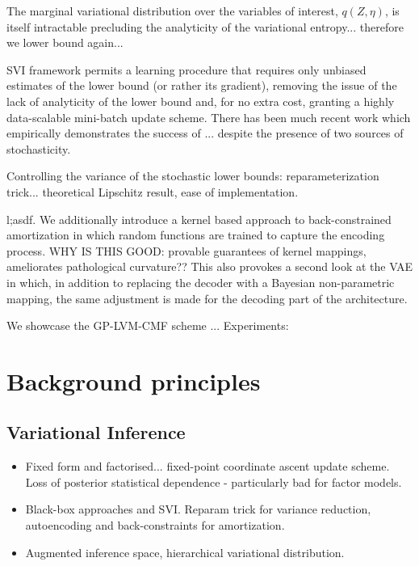 \documentclass{article}
\begin{document}
The marginal variational distribution over the variables of interest, $q(Z,\eta)$, is itself intractable precluding the analyticity of the variational entropy... therefore we lower bound again...

SVI framework permits a learning procedure that requires only unbiased estimates of the lower bound (or rather its gradient), removing the issue of the lack of analyticity of the lower bound and, for no extra cost, granting a highly data-scalable mini-batch update scheme. There has been much recent work which empirically demonstrates the success of ... despite the presence of two sources of stochasticity.

Controlling the variance of the stochastic lower bounds: reparameterization trick... theoretical Lipschitz result, ease of implementation.


l;asdf. We additionally introduce a kernel based approach to back-constrained amortization in which random functions are trained to capture the encoding process. WHY IS THIS GOOD: provable guarantees of kernel mappings, ameliorates pathological curvature??
This also provokes a second look at the VAE in which, in addition to replacing the decoder with a Bayesian non-parametric mapping, the same adjustment is made for the decoding part of the architecture.

We showcase the GP-LVM-CMF scheme ...
Experiments:

\section{Background principles}
\label{sec:background}

\subsection{Variational Inference}
\label{subsec:vi}

\begin{itemize}
  \item Fixed form and factorised... fixed-point coordinate ascent update scheme. Loss of posterior statistical dependence - particularly bad for factor models.
  \item Black-box approaches and SVI. Reparam trick for variance reduction, autoencoding and back-constraints for amortization.
  \item Augmented inference space, hierarchical variational distribution.
\end{itemize}
\end{document}
